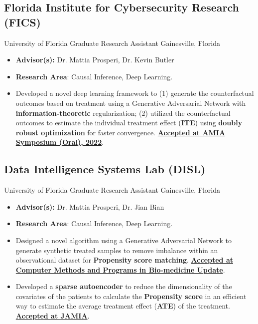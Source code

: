 \documentclass[11pt,letter,sans]{moderncv}
\begin{document}
    \subsection{Florida Institute for Cybersecurity Research (FICS)}
      {University of Florida}%
      {Graduate Research Assistant}%
      {Gainesville, Florida}%
      {}%
      {
        \begin{itemize}
        \item {\bf Advisor(s):} Dr. Mattia Prosperi, Dr. Kevin Butler
        \item {\bf Research Area}: Causal Inference, Deep Learning.
        \item Developed a novel deep learning framework to (1) generate the counterfactual outcomes based on treatment using a Generative Adversarial Network with \textbf{information-theoretic} regularization; (2) utilized the counterfactual outcomes to estimate the individual treatment effect (\textbf{ITE}) using \textbf{doubly robust optimization} for faster convergence. 
        \href{https://www.ncbi.nlm.nih.gov/pmc/articles/PMC10148269/}
        {\textbf{Accepted at AMIA Symposium (Oral), 2022}}.
        \end{itemize}
      }

  
    \subsection{Data Intelligence Systems Lab (DISL)}
      {University of Florida}%
      {Graduate Research Assistant}%
      {Gainesville, Florida}%
      {}%
      {
        \begin{itemize}
        \item {\bf Advisor(s):} Dr. Mattia Prosperi, Dr. Jian Bian
        \item {\bf Research Area}: Causal Inference, Deep Learning.
        \item Designed a novel algorithm using a Generative Adversarial Network to generate synthetic treated samples to remove imbalance within an observational dataset for \textbf{Propensity score matching}. \href{https://www.sciencedirect.com/science/article/pii/S2666990021000197/}
        {\textbf{Accepted at Computer Methods and Programs in Bio-medicine Update}}.
        \item Developed a \textbf{sparse autoencoder} to reduce the dimensionality of the covariates of the patients to calculate the \textbf{Propensity score} in an efficient way to estimate the average treatment effect (\textbf{ATE}) of the treatment. \href{https://academic.oup.com/jamia/article-abstract/28/6/1197/6139936}
        {\textbf{Accepted at JAMIA}}.
        \end{itemize}
      }
    
\end{document}
